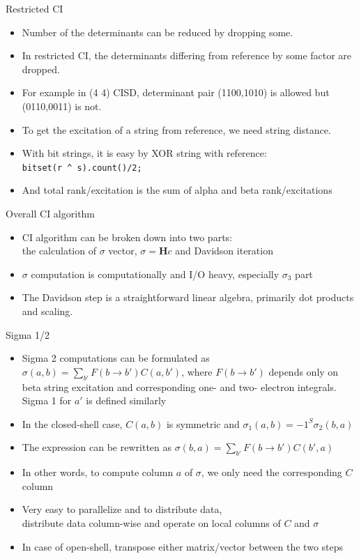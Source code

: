 \documentclass{beamer}
\begin{document}
\begin{frame}{Restricted CI}
\begin{itemize}
\item Number of the determinants can be reduced by dropping some.
\item In restricted CI, the determinants differing from reference by some factor are dropped.
\item For example in (4 4) CISD, determinant pair (1100,1010) is allowed but (0110,0011) is not.
\item To get the excitation of a string from reference, we need string distance.
\item With bit strings, it is easy by XOR string with reference: \\
  {\tt bitset(r \string^ s).count()/2; }
\item And total rank/excitation is the sum of alpha and beta rank/excitations
\end{itemize}
\end{frame}

\begin{frame}{Overall CI algorithm}
\begin{itemize}
\item CI algorithm can be broken down into two parts:  \\
  the calculation of $\sigma$ vector, $\sigma = \mathbf{H} c$ and Davidson iteration
\item $\sigma$ computation is computationally and I/O heavy, especially $\sigma_3$ part
\item The Davidson step is a straightforward linear algebra, primarily dot products and scaling.
\end{itemize}
\end{frame}

\begin{frame}{Sigma 1/2}
\begin{itemize}
\item Sigma 2 computations can be formulated as
  $\sigma(a,b) = \sum_{b'} F(b \rightarrow b') C(a,b')$, where $F(b \rightarrow b')$
  depends only on beta string excitation and corresponding one- and two- electron integrals.
  Sigma 1 for $a'$ is defined similarly
\item In the closed-shell case, $C(a,b)$ is symmetric and $\sigma_1(a,b) = -1^{S} \sigma_2(b,a)$
\item The expression can be rewritten as $\sigma(b,a) = \sum_{b'} F(b \rightarrow b') C(b',a)$
\item In other words, to compute column $a$ of $\sigma$, we only need the corresponding $C$ column
\item Very easy to parallelize and to distribute data, \\
  distribute data column-wise and operate on local columns of $C$ and $\sigma$
\item In case of open-shell, transpose either matrix/vector between the two steps
\end{itemize}
\end{frame}
\end{document}
